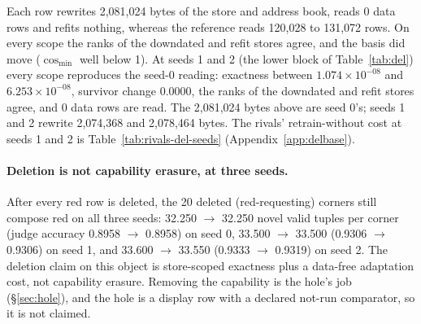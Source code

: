 \documentclass{article} %
\newcommand{\sci}[2]{\ensuremath{#1\times10^{#2}}}
\begin{document}
\noindent Each row rewrites 2,081,024 bytes of the store and address book, reads 0 data rows
and refits nothing, whereas the reference reads 120,028 to 131,072 rows. %
On every scope the ranks of the downdated and refit stores agree, and the basis did move
($\cos_{\min}$ well below 1). %
At seeds 1 and 2 (the lower block of Table~\ref{tab:del}) every scope reproduces the seed-0
reading: exactness between \sci{1.074}{-08} and \sci{6.253}{-08}, survivor change 0.0000, the
ranks of the downdated and refit stores agree, and 0 data rows are read. The 2,081,024 bytes above
are seed 0's; seeds 1 and 2 rewrite 2,074,368 and 2,078,464 bytes. The rivals' retrain-without
cost at seeds 1 and 2 is Table~\ref{tab:rivals-del-seeds} (Appendix~\ref{app:delbase}).

\paragraph{Deletion is not capability erasure, at three seeds.} After every red row is deleted,
the 20 deleted (red-requesting) corners still compose red on all three seeds: 32.250 $\to$ 32.250 %
novel valid tuples per corner (judge accuracy 0.8958 $\to$ 0.8958) on seed 0, 33.500 $\to$ 33.500 %
(0.9306 $\to$ 0.9306) on seed 1, and 33.600 $\to$ 33.550 (0.9333 $\to$ 0.9319) on seed 2. %
The deletion claim on this object is store-scoped exactness plus a data-free adaptation cost,
not capability erasure. Removing the capability is the hole's job (\S\ref{sec:hole}), and the
hole is a display row with a declared not-run comparator, so it is not claimed.
\end{document}
